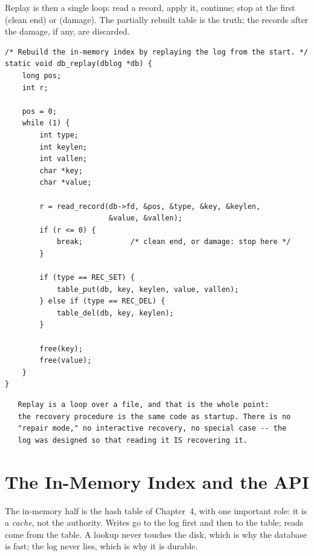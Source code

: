 Replay is then a single loop: read a record, apply it, continue; stop
at the first  (clean end) or  (damage). The partially
rebuilt table is the truth; the records after the damage, if any, are
discarded.

\begin{lstlisting}[caption={db\_replay: read the clean prefix, apply it.}]
/* Rebuild the in-memory index by replaying the log from the start. */
static void db_replay(dblog *db) {
    long pos;
    int r;

    pos = 0;
    while (1) {
        int type;
        int keylen;
        int vallen;
        char *key;
        char *value;

        r = read_record(db->fd, &pos, &type, &key, &keylen,
                        &value, &vallen);
        if (r <= 0) {
            break;           /* clean end, or damage: stop here */
        }

        if (type == REC_SET) {
            table_put(db, key, keylen, value, vallen);
        } else if (type == REC_DEL) {
            table_del(db, key, keylen);
        }

        free(key);
        free(value);
    }
}
\end{lstlisting}

\begin{verbatim}
   Replay is a loop over a file, and that is the whole point:
   the recovery procedure is the same code as startup. There is no
   "repair mode," no interactive recovery, no special case -- the
   log was designed so that reading it IS recovering it.
\end{verbatim}

\section{The In-Memory Index and the API}

The in-memory half is the hash table of Chapter~4, with one important
role: it is a \emph{cache}, not the authority. Writes go to the log
first and then to the table; reads come from the table. A lookup never
touches the disk, which is why the database is fast; the log never
lies, which is why it is durable.


